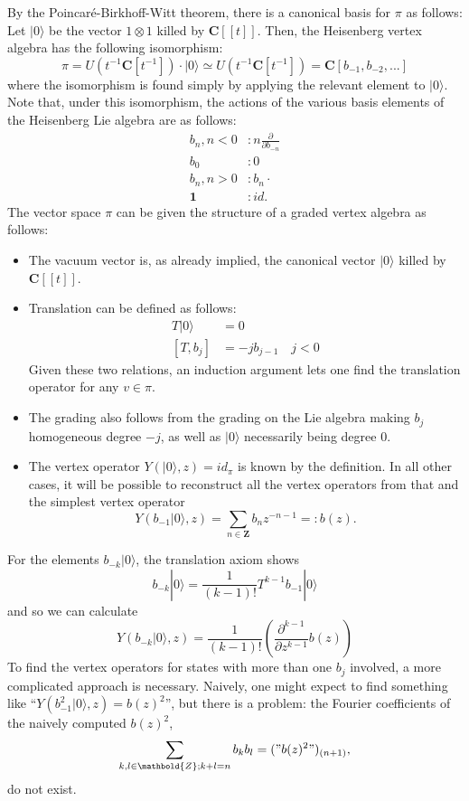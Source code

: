 \documentclass{article}
\newcommand{\CC}{\mathbold{C}}
\newcommand{\ZZ}{\mathbold{Z}}
\newcommand{\vac}{|0\rangle}
\newcommand{\one}{\mathbold{1}}
\begin{document}
By the Poincaré-Birkhoff-Witt theorem, there is a canonical basis for $\pi$ as follows: Let $\vac$ be the vector $1 \otimes 1$ killed by $\CC[[t]]$.  Then, the Heisenberg vertex algebra has the following isomorphism: 
\[\pi = U(t^{-1}\CC[t^{-1}])\cdot \vac \simeq U(t^{-1}\CC[t^{-1}])=\CC[b_{-1},b_{-2},...]  \]
where the isomorphism is found simply by applying the relevant element to $\vac$.  Note that, under this isomorphism, the actions of the various basis elements of the Heisenberg Lie algebra are as follows:
\begin{align}
  b_n, n<0&: n\frac{\partial}{\partial b_{-n}}\\
  b_0&:0\\
  b_{n},n>0&:b_n \cdot\\
  \one&:id.
\end{align}
The vector space $\pi$ can be given the structure of a graded vertex algebra as follows:
\begin{itemize}
\item The vacuum vector is, as already implied, the canonical vector $\vac$ killed by $\CC[[t]]$.
\item Translation can be defined as follows:
  \begin{align*}
    T\vac&=0\\
    [T,b_j]&=-jb_{j-1}\quad j<0
  \end{align*}
  Given these two relations, an induction argument lets one find the translation operator for any $v \in \pi$.
\item The grading also follows from the grading on the Lie algebra making $b_j$ homogeneous degree $-j$, as well as $\vac$ necessarily being degree $0$.
\item The vertex operator $Y(\vac,z)=id_\pi$ is known by the definition.  In all other cases, it will be possible to reconstruct all the vertex operators from that and the simplest vertex operator
\[Y(b_{-1}\vac,z)=\sum_{n \in \ZZ}b_nz^{-n-1}=:b(z).\]
\end{itemize}
For the elements $b_{-k} \vac$, the translation axiom shows
\[b_{-k} \vac = \frac{1}{(k-1)!}T^{k-1}b_{-1}\vac \]
and so we can calculate
\[Y(b_{-k}\vac,z)=\frac{1}{(k-1)!}\left(\frac{\partial^{k-1}}{\partial z^{k-1}} b(z) \right) \]
To find the vertex operators for states with more than one $b_j$ involved, a more complicated approach is necessary.  Naively, one might expect to find something like ``$Y(b_{-1}^2\vac,z)=b(z)^2$'', but there is a problem: the Fourier coefficients of the naively computed $b(z)^2$,
\[\sum_{k,l \in \ZZ; k+l=n}b_kb_l=("b(z)^2")_{(n+1)}, \]
do not exist.
\end{document}
